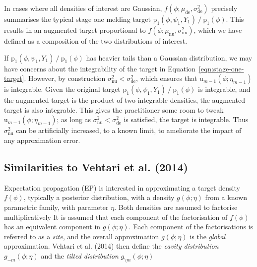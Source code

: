 \documentclass[10pt,a4paper,]{article}
\newcommand{\pd}{\text{p}}
\newcommand{\tarw}{\text{u}}
\newcommand{\modelindex}{m}
\begin{document}
In cases where all densities of interest are Gaussian,
\(f(\phi; \mu_{\text{de}}, \sigma^2_{\text{de}})\) precisely summarises
the typical stage one melding target
\(\pd_{1}(\phi, \psi_{1}, Y_{1}) \mathop{/} \pd_{1}(\phi)\). This
results in an augmented target proportional to
\(f(\phi; \mu_{\text{nu}}, \sigma^2_{\text{nu}})\), which we have
defined as a composition of the two distributions of interest.

If \(\pd_{1}(\phi, \psi_{1}, Y_{1}) \mathop{/} \pd_{1}(\phi)\) has
heavier tails than a Gaussian distribution, we may have concerns about
the integrability of the target in
Equation~\eqref{eqn:stage-one-target}. However, by construction
\(\sigma_{\text{nu}}^{2} < \sigma_{\text{de}}^{2}\), which ensures that
\(\tarw_{\modelindex - 1}(\phi; \eta_{\modelindex - 1})\) is integrable.
Given the original target
\(\pd_{1}(\phi, \psi_{1}, Y_{1}) \mathop{/} \pd_{1}(\phi)\) is
integrable, and the augmented target is the product of two integrable
densities, the augmented target is also integrable. This gives the
practitioner some room to tweak
\(\tarw_{\modelindex - 1}(\phi; \eta_{\modelindex - 1})\); as long as
\(\sigma_{\text{nu}}^{2} < \sigma_{\text{de}}^{2}\) is satisfied, the
target is integrable. Thus \(\sigma_{\text{nu}}^{2}\) can be
artificially increased, to a known limit, to ameliorate the impact of
any approximation error.

\subsection{Similarities to Vehtari et al.
(2014)}\label{similarities-to-vehtarietal14}

Expectation propagation (EP) is interested in approximating a target
density \(f(\phi)\), typically a posterior distribution, with a density
\(g(\phi; \eta)\) from a known parametric family, with parameter
\(\eta\). Both densities are assumed to factorise multiplicatively
 It
is assumed that each component of the factorisation of \(f(\phi)\) has
an equivalent component in \(g(\phi; \eta)\). Each component of the
factorisations is referred to as a \emph{site}, and the overall
approximation \(g(\phi; \eta)\) is the \emph{global} approximation.
Vehtari et al. (2014) then define the \emph{cavity distribution}
\(g_{-\modelindex}(\phi; \eta)\) and the \emph{tilted distribution}
\(g_{\setminus\modelindex}(\phi; \eta)\)

\end{document}
